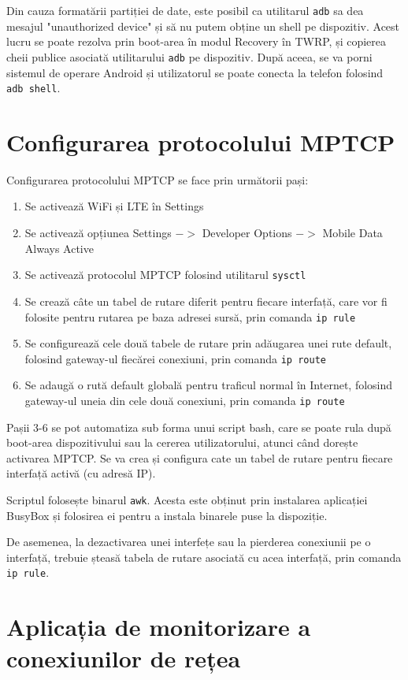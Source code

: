 Din cauza formatării partiției de date, este posibil ca utilitarul \texttt{adb} sa dea mesajul "unauthorized device" și să nu putem obține un shell pe dispozitiv. Acest lucru se poate rezolva prin boot-area în modul Recovery în TWRP, și copierea cheii publice asociată utilitarului \texttt{adb} pe dispozitiv. După aceea, se va porni sistemul de operare Android și utilizatorul se poate conecta la telefon folosind \texttt{adb shell}.

\section{Configurarea protocolului MPTCP}

Configurarea protocolului MPTCP se face prin următorii pași:
\begin{enumerate}
	\item Se activează WiFi și LTE în Settings
	\item Se activează opțiunea Settings $->$ Developer Options $->$ Mobile Data Always Active
	\item Se activează protocolul MPTCP folosind utilitarul \texttt{sysctl}
	\item Se crează câte un tabel de rutare diferit pentru fiecare interfață, care vor fi folosite pentru rutarea pe baza adresei sursă, prin comanda \texttt{ip rule}
	\item Se configurează cele două tabele de rutare prin adăugarea unei rute default, folosind gateway-ul fiecărei conexiuni, prin comanda \texttt{ip route} 
	\item Se adaugă o rută default globală pentru traficul normal în Internet, folosind gateway-ul uneia din cele două conexiuni, prin comanda \texttt{ip route}
\end{enumerate}
Pașii 3-6 se pot automatiza sub forma unui script bash, care se poate rula după boot-area dispozitivului sau la cererea utilizatorului, atunci când dorește activarea MPTCP.  Se va crea și configura cate un tabel de rutare pentru fiecare interfață activă (cu adresă IP).

Scriptul folosește binarul \texttt{awk}. Acesta este obținut prin instalarea aplicației BusyBox și folosirea ei pentru a instala binarele puse la dispoziție.

De asemenea, la dezactivarea unei interfețe sau la pierderea conexiunii pe o interfață, trebuie șteasă tabela de rutare asociată cu acea interfață, prin comanda \texttt{ip rule}. 

\section{Aplicația de monitorizare a conexiunilor de rețea}

